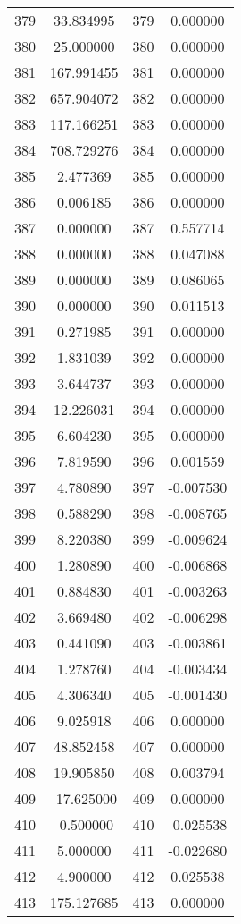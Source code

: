 \documentclass[12pt]{article}
\begin{document}
\begin{longtable}{@{}cccc@{}}
379 & 33.834995 & 379 & 0.000000 \\
380 & 25.000000 & 380 & 0.000000 \\
381 & 167.991455 & 381 & 0.000000 \\
382 & 657.904072 & 382 & 0.000000 \\
383 & 117.166251 & 383 & 0.000000 \\
384 & 708.729276 & 384 & 0.000000 \\
385 & 2.477369 & 385 & 0.000000 \\
386 & 0.006185 & 386 & 0.000000 \\
387 & 0.000000 & 387 & 0.557714 \\
388 & 0.000000 & 388 & 0.047088 \\
389 & 0.000000 & 389 & 0.086065 \\
390 & 0.000000 & 390 & 0.011513 \\
391 & 0.271985 & 391 & 0.000000 \\
392 & 1.831039 & 392 & 0.000000 \\
393 & 3.644737 & 393 & 0.000000 \\
394 & 12.226031 & 394 & 0.000000 \\
395 & 6.604230 & 395 & 0.000000 \\
396 & 7.819590 & 396 & 0.001559 \\
397 & 4.780890 & 397 & -0.007530 \\
398 & 0.588290 & 398 & -0.008765 \\
399 & 8.220380 & 399 & -0.009624 \\
400 & 1.280890 & 400 & -0.006868 \\
401 & 0.884830 & 401 & -0.003263 \\
402 & 3.669480 & 402 & -0.006298 \\
403 & 0.441090 & 403 & -0.003861 \\
404 & 1.278760 & 404 & -0.003434 \\
405 & 4.306340 & 405 & -0.001430 \\
406 & 9.025918 & 406 & 0.000000 \\
407 & 48.852458 & 407 & 0.000000 \\
408 & 19.905850 & 408 & 0.003794 \\
409 & -17.625000 & 409 & 0.000000 \\
410 & -0.500000 & 410 & -0.025538 \\
411 & 5.000000 & 411 & -0.022680 \\
412 & 4.900000 & 412 & 0.025538 \\
413 & 175.127685 & 413 & 0.000000 \\

\end{longtable}
\end{document}
